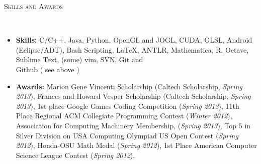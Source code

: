 \documentclass[9pt]{article}
\newenvironment{changemargin}[2]{%
  \begin{list}{}{%
    \setlength{\topsep}{0pt}%
    \setlength{\leftmargin}{#1}%
    \setlength{\rightmargin}{#2}%
    \setlength{\listparindent}{\parindent}%
    \setlength{\itemindent}{\parindent}%
    \setlength{\parsep}{\parskip}%
  }%
  \item[]}{\end{list}
}
\newcommand{\lineover}{
	\begin{changemargin}{-0.05in}{-0.05in}
		\vspace*{-8pt}
		\hrulefill \\
		\vspace*{-2pt}
	\end{changemargin}
}
\newcommand{\header}[1]{
	\begin{changemargin}{-0.5in}{-0.5in}
		\scshape{#1}\\
  	\lineover
	\end{changemargin}
}
\newenvironment{body} {
	\vspace*{-16pt}
	\begin{changemargin}{-0.25in}{-0.5in}
  }	
	{\end{changemargin}
}
\begin{document}
\header{Skills and Awards}
\smallskip
\begin{body}
	\vspace{14pt}
	
	\begin{itemize} \itemsep -0pt
	
	\item \textbf{Skills:} C/C++, Java, Python, OpenGL and JOGL, CUDA, GLSL, Android (Eclipse/ADT), Bash Scripting, \LaTeX, ANTLR,  Mathematica, R, Octave, Sublime Text, (some) vim, SVN, Git and \\ Github ( see above )\\
	\medskip
	\item \textbf{Awards:} Marion Gene Vincenti Scholarship (Caltech Scholarship, \emph{Spring 2013}), 
	Frances and Howard Vesper Scholarship (Caltech Scholarship, \emph{Spring 2013}), 
	1st place Google Games Coding Competition (\emph{Spring 2013}), 
	11th Place Regional ACM Collegiate Programming Contest (\emph{Winter 2012}), 
	Association for Computing Machinery Membership, (\emph{Spring 2013}),
	Top 5 in Silver Division on USA Computing Olympiad US Open Contest (\emph{Spring 2012}),
	Honda-OSU Math Medal (\emph{Spring 2012}),
	1st Place American Computer Science League Contest (\emph{Spring 2012}).
	\end{itemize}
\end{body}
\end{document}
